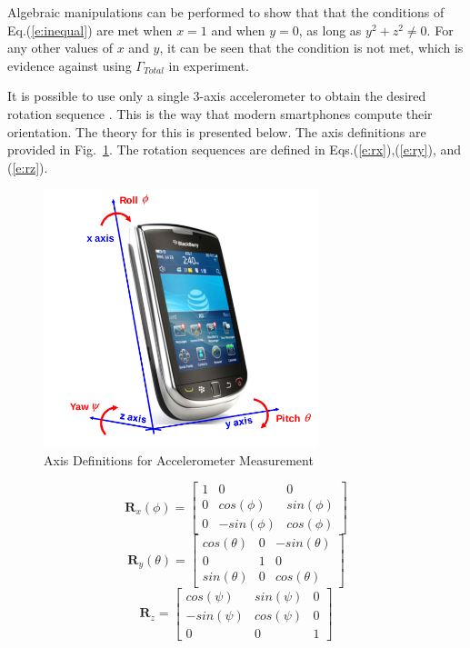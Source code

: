 \documentclass[12pt,a4paper]{book}
\begin{document}
Algebraic manipulations can be performed to show that that the conditions of Eq.(\ref{e:inequal}) are met when $x=1$ and when $y=0$, as long as $y^{2} + z^{2} \neq 0$.  For any other values of $x$ and $y$, it can be seen that the condition is not met, which is evidence against using $\Gamma_{Total}$ in experiment.

It is possible to use only a single 3-axis accelerometer to obtain the desired rotation sequence \cite{b:threeaxis}.  This is the way that modern smartphones compute their orientation. The theory for this is presented below.  The axis definitions are provided in Fig.~\ref{f:phone}.  The rotation sequences are defined in Eqs.(\ref{e:rx}),(\ref{e:ry}), and (\ref{e:rz}).
\begin{figure}[ht!]
\centering
\includegraphics[width=8cm]{phone.png}
\caption{Axis Definitions for Accelerometer Measurement}
\label{f:phone}
\end{figure}
\begin{equation}
\mathbf{R}_{x}(\phi) = \begin{bmatrix}
1 & 0 & 0\\
0 & cos(\phi) & sin(\phi)\\
0 & -sin(\phi) & cos(\phi)
\end{bmatrix}
\label{e:rx}
\end{equation}
\begin{equation}
\mathbf{R}_{y}(\theta) = \begin{bmatrix}
cos(\theta) & 0 & -sin(\theta)\\
0 & 1 & 0\\
sin(\theta) & 0 & cos(\theta)
\end{bmatrix}
\label{e:ry}
\end{equation}
\begin{equation}
\mathbf{R}_{z} = \begin{bmatrix}
cos(\psi) & sin(\psi) & 0\\
-sin(\psi) & cos(\psi) & 0\\
0 & 0 & 1
\end{bmatrix}
\label{e:rz}
\end{equation}
\end{document}
